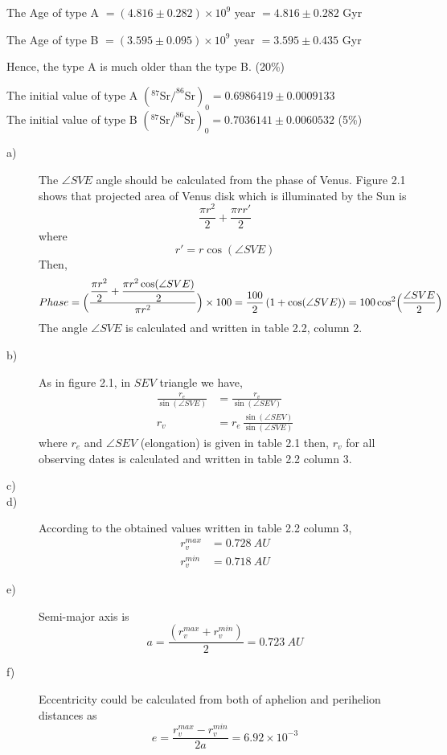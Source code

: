 \begin{description}
  The Age of type A ${}= (4.816 \pm 0.282) \times 10^{9}$ year
  ${}= 4.816 \pm 0.282$ Gyr

  The Age of type B ${}= (3.595 \pm 0.095) \times 10^{9}$ year
  ${}= 3.595 \pm 0.435$ Gyr %

  Hence, the type A is much older than the type B.
  \hfill(20\%)

\item[6.] The initial value of type A
  $\left(^{87}\mathrm{Sr}/^{86}\mathrm{Sr}\right)_0
    = 0.6986419 \pm 0.0009133$\\
  The initial value of type B
  $\left(^{87}\mathrm{Sr}/^{86}\mathrm{Sr}\right)_0
    = 0.7036141 \pm 0.0060532$
  \hfill(5\%)
\end{description}

\begin{description}
\item[a)]
The $\angle SVE$ angle should be calculated from the phase of Venus. Figure 2.1 shows that
projected area of Venus disk which is illuminated by the Sun is
\[
\frac{\pi r^2}{2} + \frac{\pi r r'}{2}
\]
where
\[
r' = r\cos(\angle SVE)
\]
Then,
\[
Phase = \Bigl(\frac{\dfrac{\pi r^2}{2} + \dfrac{\pi r^2\cos(\angle SVE)}{2}}{\pi r^2}\Bigr)
\times 100
= \frac{100}{2}\,(1 + \cos(\angle SVE)) = 100\cos^2\Bigl(\frac{\angle SVE}{2}\Bigr)
\]
The angle $\angle SVE$ is calculated and written in table 2.2, column 2.

\item[b)]
As in figure 2.1, in $SEV$ triangle we have,
\begin{align*}
\frac{r_e}{\sin(\angle SVE)} &= \frac{r_v}{\sin(\angle SEV)}\\
r_v &= r_e\,\frac{\sin(\angle SEV)}{\sin(\angle SVE)}
\end{align*}
where $r_e$ and $\angle SEV$ (elongation) is given in table 2.1 then, $r_v$ for all observing
dates is calculated and written in table 2.2 column 3.

\item[c)]

\item[d)]
According to the obtained values written in table 2.2 column 3,
\begin{align*}
r_v^{max} &= 0.728\ AU\\
r_v^{min} &= 0.718\ AU
\end{align*}

\item[e)]
Semi-major axis is
\[
a = \frac{(r_v^{max} + r_v^{min})}{2} = 0.723\ AU
\]

\item[f)]
Eccentricity could be calculated from both of aphelion and perihelion distances as
\[
e = \frac{r_v^{max} - r_v^{min}}{2a} = 6.92\times10^{-3}
\]
\end{description}

